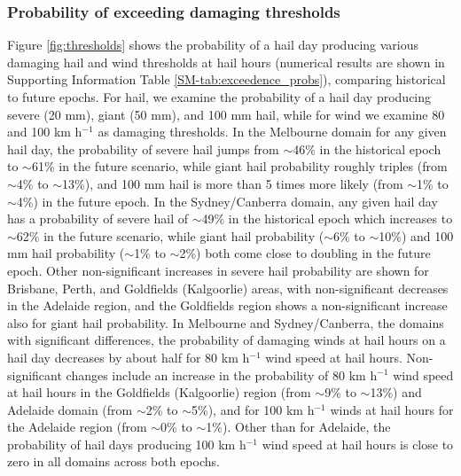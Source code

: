 \documentclass[]{agujournal2019}\usepackage[]{graphicx}\usepackage[]{xcolor}
\begin{document}
\subsubsection{Probability of exceeding damaging thresholds}



Figure \ref{fig:thresholds} shows the probability of a hail day producing various damaging hail and wind thresholds at hail hours (numerical results are shown in Supporting Information Table \ref{SM-tab:exceedence_probs}), comparing historical to future epochs. For hail, we examine the probability of a hail day producing severe (20 mm), giant (50 mm), and 100 mm hail, while for wind we examine 80 and 100 km h$^{-1}$ as damaging thresholds. In the Melbourne domain for any given hail day, the probability of severe hail jumps from $\sim$46\% in the historical epoch to $\sim$61\% in the future scenario, while giant hail probability roughly triples (from $\sim$4\% to $\sim$13\%), and 100 mm hail is more than 5 times more likely (from $\sim$1\% to $\sim$4\%) in the future epoch. In the Sydney/Canberra domain, any given hail day has a probability of severe hail of $\sim$49\% in the historical epoch which increases to $\sim$62\% in the future scenario, while giant hail probability ($\sim$6\% to $\sim$10\%) and 100 mm hail probability ($\sim$1\% to $\sim$2\%) both come close to doubling in the future epoch. Other non-significant increases in severe hail probability are shown for Brisbane, Perth, and Goldfields (Kalgoorlie) areas, with non-significant decreases in the Adelaide region, and the Goldfields region shows a non-significant increase also for giant hail probability. In Melbourne and Sydney/Canberra, the domains with significant differences, the probability of damaging winds at hail hours on a hail day decreases by about half for 80 km h$^{-1}$ wind speed at hail hours. Non-significant changes include an increase in the probability of 80 km h$^{-1}$ wind speed at hail hours in the Goldfields (Kalgoorlie) region (from $\sim$9\% to $\sim$13\%) and Adelaide domain (from $\sim$2\% to $\sim$5\%), and for 100 km h$^{-1}$ winds at hail hours for the Adelaide region (from $\sim$0\% to $\sim$1\%).  Other than for Adelaide, the probability of hail days producing 100 km h$^{-1}$ wind speed at hail hours is close to zero in all domains across both epochs. 
\end{document}
